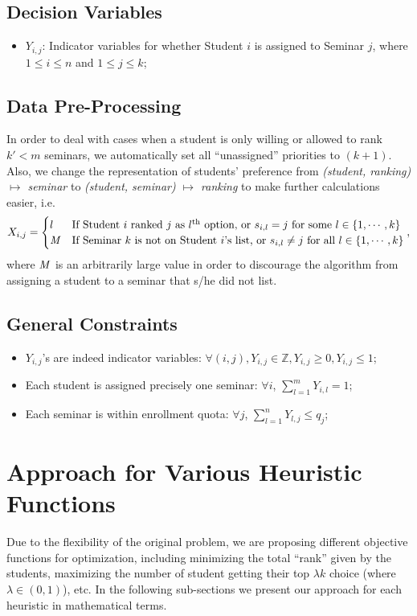 \documentclass{article} %
\begin{document}
\subsection{Decision Variables}
\begin{itemize}
    \item $Y_{i,j}$: Indicator variables for whether Student $i$ is assigned to Seminar $j$, where $1\leq i \leq n$ and $1\leq j \leq k$;
\end{itemize}

\subsection{Data Pre-Processing}
    \par\qquad In order to deal with cases when a student is only willing or allowed to rank $k'<m$ seminars, we automatically set all ``unassigned'' priorities to $(k+1)$. Also, we change the representation of students' preference from \emph{(student, ranking) $\mapsto$ seminar} to \emph{(student, seminar) $\mapsto$ ranking} to make further calculations easier, i.e.
        $$X_{i,j}=\begin{cases}
                    l &\text{If Student $i$ ranked $j$ as $l^{\text{th}}$ option, or $s_{i,l}=j$ for some $l\in\{1,\cdots,k\}$}\\
                    {\bf\it M}     &\text{If Seminar $k$ is not on Student $i$'s list, or $s_{i,l} \neq j$ for all $l\in\{1,\cdots,k\}$}
                  \end{cases},$$
    where ${\bf\it M}$ is an arbitrarily large value in order to discourage the algorithm from assigning a student to a seminar that s/he did not list.

\subsection{General Constraints}
    \begin{itemize}
    \item $Y_{i,j}$'s are indeed indicator variables: $\forall (i,j), Y_{i,j}\in\mathbb{Z}, Y_{i,j}\geq 0, Y_{i,j}\leq 1$;
    \item Each student is assigned precisely one seminar: $\forall i$, $\sum_{l=1}^{m}{Y_{i,l}}=1$;
    \item Each seminar is within enrollment quota: $\forall j$, $\sum_{l=1}^{n}{Y_{l,j}} \leq q_j$;
\end{itemize}

%
%
\section{Approach for Various Heuristic Functions}
    \par\qquad Due to the flexibility of the original problem, we are proposing different objective functions for optimization, including minimizing the total ``rank'' given by the students, maximizing the number of student getting their top $\lambda k$ choice (where $\lambda\in(0,1)$), etc. In the following sub-sections we present our approach for each heuristic in mathematical terms.
\end{document}
